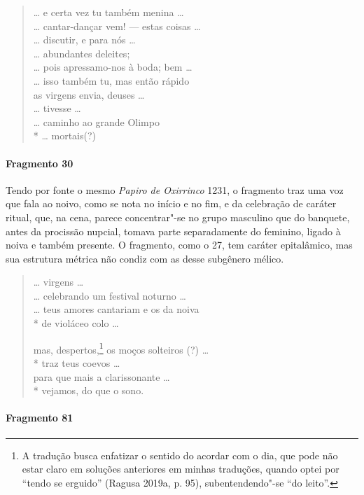 \begin{verse}
\ldots{} e certa vez tu também menina \ldots{}\\
\ldots{} cantar-dançar vem! --- estas coisas \ldots{}\\
\ldots{} discutir, e para nós \ldots{}\\
\ldots{} abundantes deleites;\\
\ldots{} pois apressamo-nos à boda; bem \ldots{}\\
\ldots{} isso também tu, mas então rápido\\
as virgens envia, deuses \ldots{}\\
\ldots{} tivesse \ldots{}\\
\ldots{} caminho ao grande Olimpo\\*
\ldots{} mortais(?)
\end{verse}

\paragraph{Fragmento 30}

{\small Tendo por fonte o mesmo \textit{Papiro de Oxirrinco} 1231, o fragmento traz uma
voz que fala ao noivo, como se nota no início e no fim, e da celebração de
caráter ritual, que, na cena, parece concentrar"-se no grupo masculino que do
banquete, antes da procissão nupcial, tomava parte separadamente do feminino,
ligado à noiva e também presente. O fragmento, como o 27, tem caráter
epitalâmico, mas sua estrutura métrica não condiz com as desse subgênero
mélico.}

\begin{verse}
\ldots{} virgens \ldots{}\\
\ldots{} celebrando um festival noturno \ldots{}\\
\ldots{} teus amores cantariam e os da noiva\\*
de violáceo colo \ldots{}

mas, despertos,\footnote{A tradução busca enfatizar o sentido do acordar com o dia, que pode não estar claro em soluções anteriores em minhas traduções, quando optei por ``tendo se erguido'' (Ragusa 2019a, p. 95), subentendendo"-se ``do leito''.} os moços solteiros (?) \ldots{}\\*
traz teus coevos  \ldots{}\\
para que mais a clarissonante \ldots{}\\*
vejamos, do que o sono.
\end{verse}

\paragraph{Fragmento 81}

